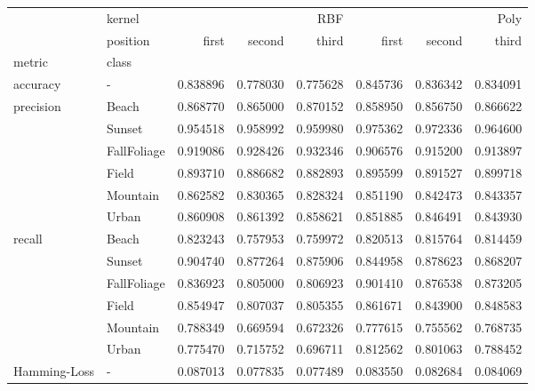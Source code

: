 \begin{tabular}{llrrrrrr}
\toprule
 & kernel & \multicolumn{3}{r}{RBF} & \multicolumn{3}{r}{Poly} \\
 & position & first & second & third & first & second & third \\
metric & class &  &  &  &  &  &  \\
\midrule
accuracy & - & 0.838896 & 0.778030 & 0.775628 & 0.845736 & 0.836342 & 0.834091 \\
\cline{1-8}
\multirow[t]{6}{*}{precision} & Beach & 0.868770 & 0.865000 & 0.870152 & 0.858950 & 0.856750 & 0.866622 \\
 & Sunset & 0.954518 & 0.958992 & 0.959980 & 0.975362 & 0.972336 & 0.964600 \\
 & FallFoliage & 0.919086 & 0.928426 & 0.932346 & 0.906576 & 0.915200 & 0.913897 \\
 & Field & 0.893710 & 0.886682 & 0.882893 & 0.895599 & 0.891527 & 0.899718 \\
 & Mountain & 0.862582 & 0.830365 & 0.828324 & 0.851190 & 0.842473 & 0.843357 \\
 & Urban & 0.860908 & 0.861392 & 0.858621 & 0.851885 & 0.846491 & 0.843930 \\
\cline{1-8}
\multirow[t]{6}{*}{recall} & Beach & 0.823243 & 0.757953 & 0.759972 & 0.820513 & 0.815764 & 0.814459 \\
 & Sunset & 0.904740 & 0.877264 & 0.875906 & 0.844958 & 0.878623 & 0.868207 \\
 & FallFoliage & 0.836923 & 0.805000 & 0.806923 & 0.901410 & 0.876538 & 0.873205 \\
 & Field & 0.854947 & 0.807037 & 0.805355 & 0.861671 & 0.843900 & 0.848583 \\
 & Mountain & 0.788349 & 0.669594 & 0.672326 & 0.777615 & 0.755562 & 0.768735 \\
 & Urban & 0.775470 & 0.715752 & 0.696711 & 0.812562 & 0.801063 & 0.788452 \\
\cline{1-8}
Hamming-Loss & - & 0.087013 & 0.077835 & 0.077489 & 0.083550 & 0.082684 & 0.084069 \\
\cline{1-8}
\bottomrule
\end{tabular}
